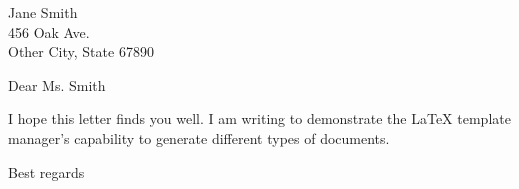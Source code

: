 \documentclass{letter}
\date{\today}
\begin{document}
\begin{letter}{Jane Smith\\456 Oak Ave.\\Other City, State 67890}
\opening{Dear Ms. Smith}

I hope this letter finds you well. I am writing to demonstrate the LaTeX template manager's capability to generate different types of documents.

\closing{Best regards}

\end{letter}
\end{document}
